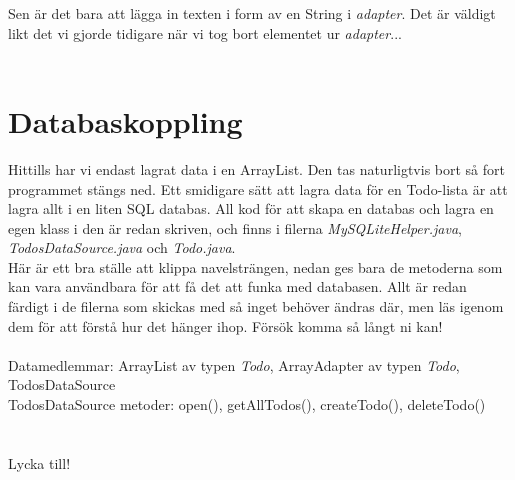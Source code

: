 \documentclass[11 pt, titlepage]{article} %
\begin{document}
Sen är det bara att lägga in texten i form av en String i \textit{adapter}. Det är väldigt likt det vi gjorde tidigare när vi tog bort elementet ur \textit{adapter}...\\ \\
\section{Databaskoppling}
Hittills har vi endast lagrat data i en ArrayList. Den tas naturligtvis bort så fort programmet stängs ned. Ett smidigare sätt att lagra data för en Todo-lista är att lagra allt i en liten SQL databas. All kod för att skapa en databas och lagra en egen klass i den är redan skriven, och finns i filerna \textit{MySQLiteHelper.java}, \textit{TodosDataSource.java} och \textit{Todo.java}.\\

Här är ett bra ställe att klippa navelsträngen, nedan ges bara de metoderna som kan vara användbara för att få det att funka med databasen. Allt är redan färdigt i de filerna som skickas med så inget behöver ändras där, men läs igenom dem för att förstå hur det hänger ihop. Försök komma så långt ni kan!\\ \\

Datamedlemmar: ArrayList av typen \textit{Todo}, ArrayAdapter av typen \textit{Todo}, TodosDataSource \\
TodosDataSource metoder: open(), getAllTodos(), createTodo(), deleteTodo() \\

\\ \\

Lycka till!
\end{document}
